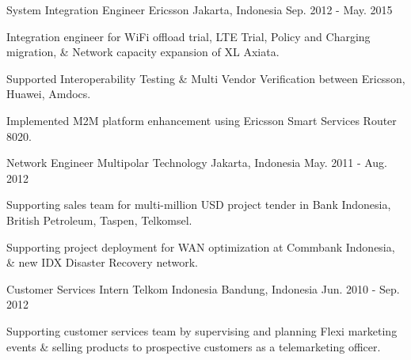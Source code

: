 \begin{cventries}
  \cventry
    {System Integration Engineer} %
    {Ericsson} %
    {Jakarta, Indonesia} %
    {Sep. 2012 - May. 2015} %
    {
      \begin{cvitems} %
        \item {Integration engineer for WiFi offload trial, LTE Trial, Policy and Charging migration, \& Network capacity expansion of XL Axiata.}
        \item {Supported Interoperability Testing \& Multi Vendor Verification between Ericsson, Huawei, Amdocs.}
        \item {Implemented M2M platform enhancement using Ericsson Smart Services Router 8020.}
      \end{cvitems}
    }

  \cventry
    {Network Engineer} %
    {Multipolar Technology} %
    {Jakarta, Indonesia} %
    {May. 2011 - Aug. 2012} %
    {
      \begin{cvitems} %
        \item {Supporting sales team for multi-million USD project tender in Bank Indonesia, British Petroleum, Taspen, Telkomsel.}
        \item {Supporting project deployment for WAN optimization at Commbank Indonesia, \& new IDX Disaster Recovery network.}
      \end{cvitems}
    }

  \cventry
    {Customer Services Intern} %
    {Telkom Indonesia} %
    {Bandung, Indonesia} %
    {Jun. 2010 - Sep. 2012} %
    {
      \begin{cvitems} %
        \item {Supporting customer services team by supervising and planning Flexi marketing events \& selling products to prospective customers as a telemarketing officer.}
      \end{cvitems}
    }

\end{cventries}
